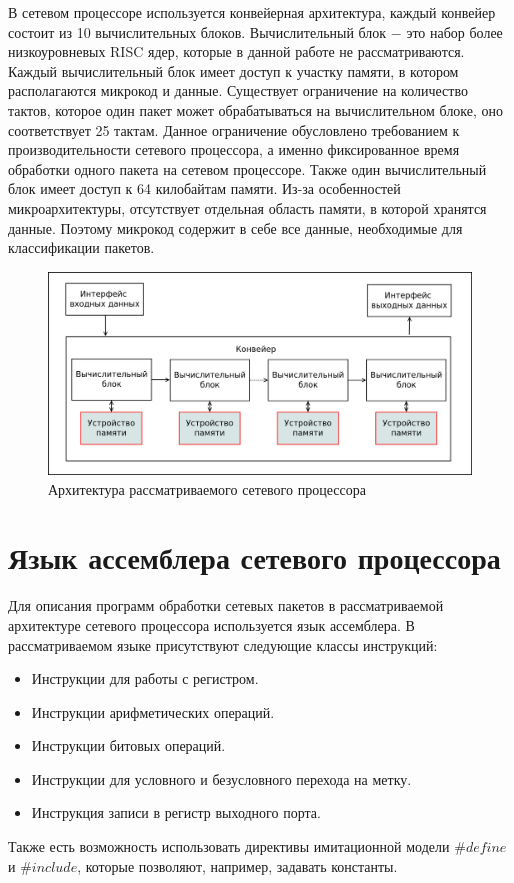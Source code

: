 \documentclass[a4paper, 12pt, titlepage, finall]{extreport}
\begin{document}
            В сетевом процессоре используется конвейерная архитектура, каждый конвейер состоит из 10 вычислительных блоков. 
            Вычислительный блок $-$ это набор более низкоуровневых RISC ядер, которые в данной работе не рассматриваются. 
            Каждый вычислительный блок имеет доступ к участку памяти, в котором располагаются микрокод и данные.
            Существует ограничение на количество тактов, которое один пакет может обрабатываться на вычислительном блоке, оно соответствует 25 тактам.
            Данное ограничение обусловлено требованием к производительности сетевого процессора, а именно фиксированное время обработки одного пакета на сетевом процессоре.
            Также один вычислительный блок имеет доступ к 64 килобайтам памяти.
            Из-за особенностей микроархитектуры, отсутствует отдельная область памяти, в которой хранятся данные. Поэтому микрокод содержит в себе все данные,
            необходимые для классификации пакетов.

            \begin{figure}[h]
                \includegraphics[width=\textwidth]{npu_all.png}
                \caption{Архитектура рассматриваемого сетевого процессора}
            \end{figure}
            
        \section{Язык ассемблера сетевого процессора}
            Для описания программ обработки сетевых пакетов в рассматриваемой архитектуре сетевого процессора используется язык ассемблера. 
            В рассматриваемом языке присутствуют следующие классы инструкций:
            \begin{itemize}
                \item Инструкции для работы с регистром.
                \item Инструкции арифметических операций.
                \item Инструкции битовых операций.
                \item Инструкции для условного и безусловного перехода на метку.
                \item Инструкция записи в регистр выходного порта.
            \end{itemize}
            Также есть возможность использовать директивы имитационной модели $\#define$ и $\#include$, которые позволяют, например, задавать константы.
           
\end{document}
